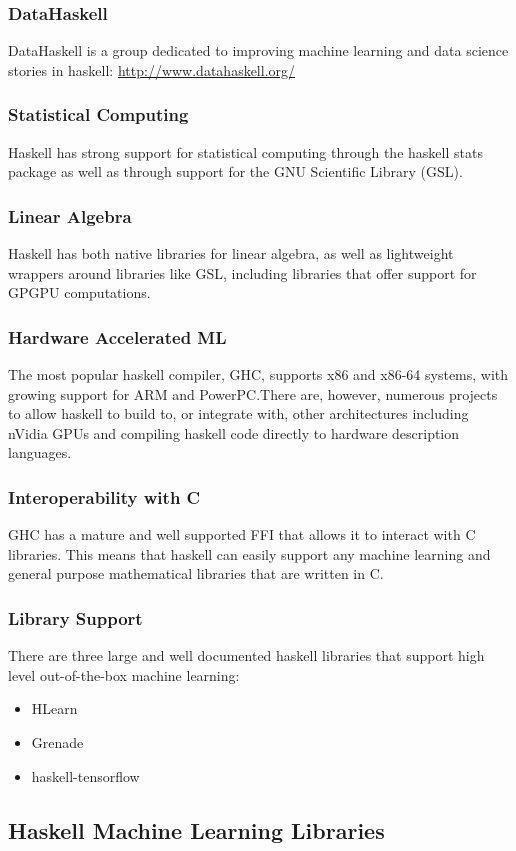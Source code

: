 \documentclass{beamer}
\begin{document}
\begin{frame}
  \frametitle{DataHaskell}
  DataHaskell is a group dedicated to improving machine learning and
  data science stories in haskell:
  \url{http://www.datahaskell.org/}
\end{frame}

\begin{frame}
  \frametitle{Statistical Computing}
  Haskell has strong support for statistical computing through the
  haskell stats package as well as through support for the GNU
  Scientific Library (GSL).
\end{frame}

\begin{frame}
  \frametitle{Linear Algebra}
  Haskell has both native libraries for linear algebra, as well as
  lightweight wrappers around libraries like GSL, including libraries
  that offer support for GPGPU computations.
\end{frame}

\begin{frame}
  \frametitle{Hardware Accelerated ML}
  The most popular haskell compiler, GHC, supports x86 and x86-64
  systems, with growing support for ARM and PowerPC.\@  There are,
  however, numerous projects to allow haskell to build to, or
  integrate with, other architectures including nVidia GPUs and
  compiling haskell code directly to hardware description languages.
\end{frame}

\begin{frame}
  \frametitle{Interoperability with C}
  GHC has a mature and well supported FFI that allows it to interact
  with C libraries.  This means that haskell can easily support any
  machine learning and general purpose mathematical libraries that are
  written in C.
\end{frame}

\begin{frame}
  \frametitle{Library Support}
  There are three large and well documented haskell libraries that
  support high level out-of-the-box machine learning:
  \begin{itemize}
  \item HLearn
  \item Grenade
  \item haskell-tensorflow
  \end{itemize}
\end{frame}

\subsection{Haskell Machine Learning Libraries}
\end{document}
